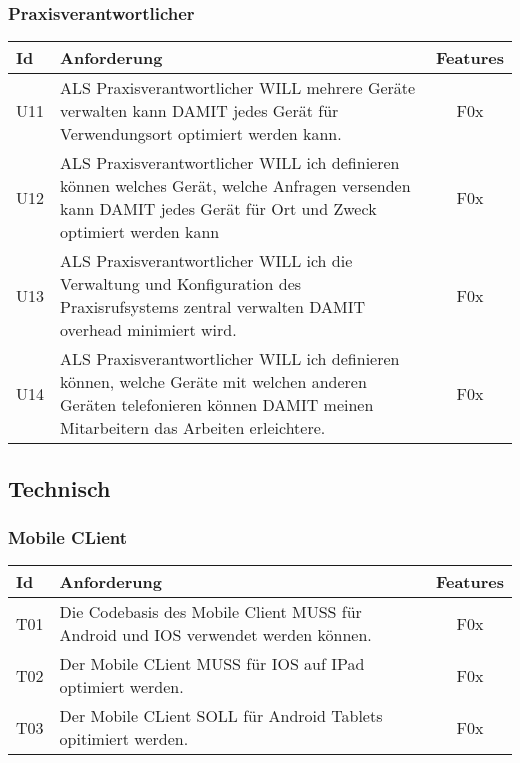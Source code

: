 \subsubsection*{Praxisverantwortlicher}

\begin{table}[h]
    \centering
    \begin{tabular}{|l|p{13cm}|c|}
        \hline
        \textbf{Id} & \textbf{Anforderung}                                                                                                                                                     & \textbf{Features} \\
        \hline
        U11         & ALS Praxisverantwortlicher WILL mehrere Geräte verwalten kann DAMIT jedes Gerät für Verwendungsort optimiert werden kann. & F0x \\
        \hline
        U12         & ALS Praxisverantwortlicher WILL ich definieren können welches Gerät, welche Anfragen versenden kann DAMIT jedes Gerät für Ort und Zweck optimiert werden kann & F0x \\
        \hline
        U13         & ALS Praxisverantwortlicher WILL ich die Verwaltung und Konfiguration des Praxisrufsystems zentral verwalten DAMIT overhead minimiert wird. & F0x \\
        \hline
        U14         & ALS Praxisverantwortlicher WILL ich definieren können, welche Geräte mit welchen anderen Geräten telefonieren können DAMIT meinen Mitarbeitern das Arbeiten erleichtere. & F0x \\
        \hline
    \end{tabular}\label{tab:userstories2}
\end{table}


\clearpage

\subsection{Technisch}\label{subsec:technisch}


\subsubsection*{Mobile CLient}

\begin{table}[h]
    \centering
    \begin{tabular}{|l|p{13cm}|c|}
        \hline
        \textbf{Id} & \textbf{Anforderung}                                                              & \textbf{Features} \\
        \hline
        T01         & Die Codebasis des Mobile Client MUSS für Android und IOS verwendet werden können. & F0x \\
        \hline
        T02         & Der Mobile CLient MUSS für IOS auf IPad optimiert werden.                         & F0x               \\
        \hline
        T03         & Der Mobile CLient SOLL für Android Tablets opitimiert werden.                     & F0x               \\
        \hline
    \end{tabular}\label{tab:userstories3}
\end{table}

